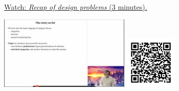 
\begin{minipage}{10cm}
    \href{https://act4e-spring21.netlify.app/videos/spring2021-profunctors:recap-design.html}{Watch: \emph{Recap of design problems} (3 minutes).}
        
    \href{https://act4e-spring21.netlify.app/videos/spring2021-profunctors:recap-design.html}{\includegraphics[height=3.5cm]{spring2021-profunctors:recap-design/thumbnails.jpg}}
    \href{https://act4e-spring21.netlify.app/videos/spring2021-profunctors:recap-design.html}{\includegraphics[height=2.5cm]{spring2021-profunctors:recap-design/qrcode.png}}
\end{minipage}
